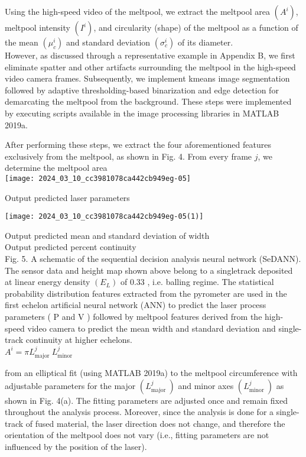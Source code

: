 \documentclass[10pt]{article}
\begin{document}
Using the high-speed video of the meltpool, we extract the meltpool area $\left(A^{i}\right)$, meltpool intensity $\left(I^{i}\right)$, and circularity (shape) of the meltpool as a function of the mean $\left(\mu_{c}^{i}\right)$ and standard deviation $\left(\sigma_{c}^{i}\right)$ of its diameter.\\
However, as discussed through a representative example in Appendix B, we first eliminate spatter and other artifacts surrounding the meltpool in the high-speed video camera frames. Subsequently, we implement kmeans image segmentation followed by adaptive thresholding-based binarization and edge detection for demarcating the meltpool from the background. These steps were implemented by executing scripts available in the image processing libraries in MATLAB 2019a.

After performing these steps, we extract the four aforementioned features exclusively from the meltpool, as shown in Fig. 4. From every frame $j$, we determine the meltpool area\\
\texttt{[image: 2024\_03\_10\_cc3981078ca442cb949eg-05]}

Output predicted laser parameters

\begin{center}
\texttt{[image: 2024\_03\_10\_cc3981078ca442cb949eg-05(1)]}
\end{center}

Output predicted mean and standard deviation of width\\
Output predicted percent continuity\\
Fig. 5. A schematic of the sequential decision analysis neural network (SeDANN). The sensor data and height map shown above belong to a singletrack deposited at linear energy density $\left(E_{L}\right)$ of 0.33 , i.e. balling regime. The statistical probability distribution features extracted from the pyrometer are used in the first echelon artificial neural network (ANN) to predict the laser process parameters ( $\mathrm{P}$ and $\mathrm{V}$ ) followed by meltpool features derived from the high-speed video camera to predict the mean width and standard deviation and single-track continuity at higher echelons.\\
$A^{i}=\pi L_{\text {major }}^{j} L_{\text {minor }}^{j}$

from an elliptical fit (using MATLAB 2019a) to the meltpool circumference with adjustable parameters for the major $\left(L_{\text {major }}^{j}\right)$ and minor axes $\left(L_{\text {minor }}^{j}\right)$ as shown in Fig. 4(a). The fitting parameters are adjusted once and remain fixed throughout the analysis process. Moreover, since the analysis is done for a single-track of fused material, the laser direction does not change, and therefore the orientation of the meltpool does not vary (i.e., fitting parameters are not influenced by the position of the laser).
\end{document}
